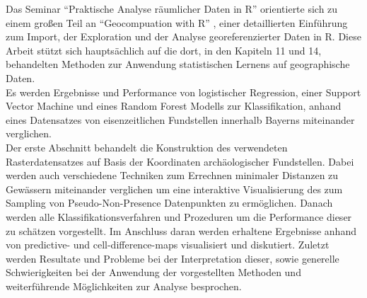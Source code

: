 Das Seminar ``Praktische Analyse räumlicher Daten in R'' orientierte sich zu einem großen Teil an ``Geocompuation with R'' \cite{lovelace2019}, einer detaillierten Einführung zum Import, der Exploration und der Analyse georeferenzierter Daten in R. Diese Arbeit stützt sich hauptsächlich auf die dort, in den Kapiteln 11 und 14, behandelten Methoden zur Anwendung statistischen Lernens auf geographische Daten. \\
Es werden Ergebnisse und Performance von logistischer Regression, einer Support Vector Machine und eines Random Forest Modells zur Klassifikation, anhand eines Datensatzes von eisenzeitlichen Fundstellen innerhalb Bayerns miteinander verglichen. \\
Der erste Abschnitt behandelt die Konstruktion des verwendeten Rasterdatensatzes auf Basis der Koordinaten archäologischer Fundstellen. Dabei werden auch verschiedene Techniken zum Errechnen minimaler Distanzen zu Gewässern miteinander verglichen um eine interaktive Visualisierung des zum Sampling von Pseudo-Non-Presence Datenpunkten zu ermöglichen. Danach werden alle Klassifikationsverfahren und Prozeduren um die Performance dieser zu schätzen vorgestellt. Im Anschluss daran werden erhaltene Ergebnisse anhand von predictive- und cell-difference-maps visualisiert und diskutiert. Zuletzt werden Resultate und Probleme bei der Interpretation dieser, sowie generelle Schwierigkeiten bei der Anwendung der vorgestellten Methoden und weiterführende Möglichkeiten zur Analyse besprochen. 